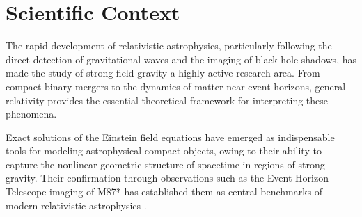 \section*{Scientific Context}

The rapid development of relativistic astrophysics, particularly following the direct detection of gravitational waves and the imaging of black hole shadows, has made the study of strong-field gravity a highly active research area. From compact binary mergers to the dynamics of matter near event horizons, general relativity provides the essential theoretical framework for interpreting these phenomena.

Exact solutions of the Einstein field equations have emerged as indispensable tools for modeling astrophysical compact objects, owing to their ability to capture the nonlinear geometric structure of spacetime in regions of strong gravity. Their confirmation through observations such as the Event Horizon Telescope imaging of M87* has established them as central benchmarks of modern relativistic astrophysics \cite{eht2019}.

\perfectdivider
